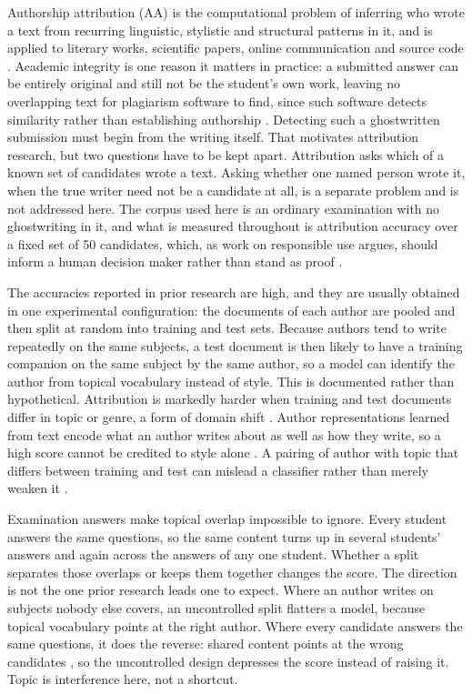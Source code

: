 \documentclass[conference]{IEEEtran}
\begin{document}
Authorship attribution (AA) is the computational problem of inferring who wrote a text from recurring linguistic, stylistic and structural patterns in it, and is applied to literary works, scientific papers, online communication and source code \cite{Bogomolov2021,He2024,Huang2024}. Academic integrity is one reason it matters in practice: a submitted answer can be entirely original and still not be the student's own work, leaving no overlapping text for plagiarism software to find, since such software detects similarity rather than establishing authorship \cite{Pratiwi2021,He2024,Tyo2022}. Detecting such a ghostwritten submission must begin from the writing itself. That motivates attribution research, but two questions have to be kept apart. Attribution asks which of a known set of candidates wrote a text. Asking whether one named person wrote it, when the true writer need not be a candidate at all, is a separate problem and is not addressed here. The corpus used here is an ordinary examination with no ghostwriting in it, and what is measured throughout is attribution accuracy over a fixed set of 50 candidates, which, as work on responsible use argues, should inform a human decision maker rather than stand as proof \cite{Saxena2025}.

The accuracies reported in prior research are high, and they are usually obtained in one experimental configuration: the documents of each author are pooled and then split at random into training and test sets. Because authors tend to write repeatedly on the same subjects, a test document is then likely to have a training companion on the same subject by the same author, so a model can identify the author from topical vocabulary instead of style. This is documented rather than hypothetical. Attribution is markedly harder when training and test documents differ in topic or genre, a form of domain shift \cite{Barlas2021}. Author representations learned from text encode what an author writes about as well as how they write, so a high score cannot be credited to style alone \cite{Wegmann2022,Terreau2021}. A pairing of author with topic that differs between training and test can mislead a classifier rather than merely weaken it \cite{Altakrori2021}.

Examination answers make topical overlap impossible to ignore. Every student answers the same questions, so the same content turns up in several students' answers and again across the answers of any one student. Whether a split separates those overlaps or keeps them together changes the score. The direction is not the one prior research leads one to expect. Where an author writes on subjects nobody else covers, an uncontrolled split flatters a model, because topical vocabulary points at the right author. Where every candidate answers the same questions, it does the reverse: shared content points at the wrong candidates \cite{Altakrori2021}, so the uncontrolled design depresses the score instead of raising it. Topic is interference here, not a shortcut.
\end{document}
